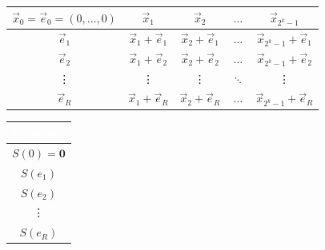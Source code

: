 
\begin{center}
\renewcommand{\arraystretch}{1.5}
\small
\begin{tabular}{|c|c|c|c|c|}
    \hline
    \rowcolor{white} $\vec{x}_0 = \vec{e}_0 = (0, \dots, 0)$ & $\vec{x}_1$ & $\vec{x}_2$ & $\dots$ & $\vec{x}_{2^k-1}$ \\ \hline
    \rowcolor{rowblue} $\vec{e}_1$ & $\vec{x}_1 + \vec{e}_1$ & $\vec{x}_2 + \vec{e}_1$ & $\dots$ & $\vec{x}_{2^k-1} + \vec{e}_1$ \\ \hline
    \rowcolor{white} $\vec{e}_2$ & $\vec{x}_1 + \vec{e}_2$ & $\vec{x}_2 + \vec{e}_2$ & $\dots$ & $\vec{x}_{2^k-1} + \vec{e}_2$ \\ \hline
    \rowcolor{rowblue} \vdots & \vdots & \vdots & $\ddots$ & \vdots \\ \hline
    \rowcolor{white} $\vec{e}_R$ & $\vec{x}_1 + \vec{e}_R$ & $\vec{x}_2 + \vec{e}_R$ & $\dots$ & $\vec{x}_{2^k-1} + \vec{e}_R$ \\ \hline
\end{tabular}
\quad
\begin{tabular}{|c|}
    \hline
    \rowcolor{headerblue} \textcolor{white}{\textbf{Sindromi}} \\ \hline
    \rowcolor{white} $S(0) = \mathbf{0}$ \\ \hline
    \rowcolor{rowblue} $S(e_1)$ \\ \hline
    \rowcolor{white} $S(e_2)$ \\ \hline
    \rowcolor{rowblue} \vdots \\ \hline
    \rowcolor{white} $S(e_R)$ \\ \hline
\end{tabular}
\end{center}